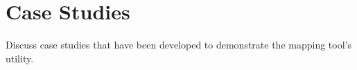 \section{Case Studies}
\label{sec:case_studies}

Discuss case studies that have been developed to demonstrate the mapping tool's utility.